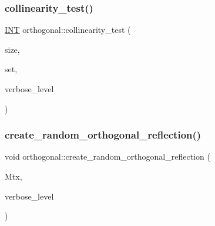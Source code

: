 \mbox{\label{classorthogonal_a36b9dba38fbbecaedbf32ee298aafa32}} 
\subsubsection{\texorpdfstring{collinearity\+\_\+test()}{collinearity\_test()}}
{\footnotesize\ttfamily \mbox{\hyperlink{galois_8h_a09fddde158a3a20bd2dcadb609de11dc}{I\+NT}} orthogonal\+::collinearity\+\_\+test (\begin{DoxyParamCaption}\item[{\mbox{\hyperlink{galois_8h_a09fddde158a3a20bd2dcadb609de11dc}{I\+NT}}}]{size,  }\item[{\mbox{\hyperlink{galois_8h_a09fddde158a3a20bd2dcadb609de11dc}{I\+NT}} $\ast$}]{set,  }\item[{\mbox{\hyperlink{galois_8h_a09fddde158a3a20bd2dcadb609de11dc}{I\+NT}}}]{verbose\+\_\+level }\end{DoxyParamCaption})}

\mbox{\label{classorthogonal_a8cf782be9d4f9ffd3dfcd485e374e879}} 
\subsubsection{\texorpdfstring{create\+\_\+random\+\_\+orthogonal\+\_\+reflection()}{create\_random\_orthogonal\_reflection()}}
{\footnotesize\ttfamily void orthogonal\+::create\+\_\+random\+\_\+orthogonal\+\_\+reflection (\begin{DoxyParamCaption}\item[{\mbox{\hyperlink{galois_8h_a09fddde158a3a20bd2dcadb609de11dc}{I\+NT}} $\ast$}]{Mtx,  }\item[{\mbox{\hyperlink{galois_8h_a09fddde158a3a20bd2dcadb609de11dc}{I\+NT}}}]{verbose\+\_\+level }\end{DoxyParamCaption})}

\mbox{\label{classorthogonal_aef283326b1eb3cb1bc6992db12457a5e}} 
